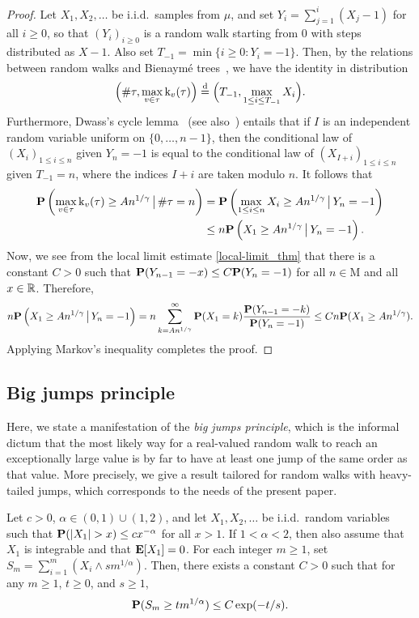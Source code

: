 \documentclass[11pt,reqno]{amsart}
\newcommand{\rk}{\mathrm{k}}
\begin{document}
\begin{proof}
Let $X_1,X_2,\ldots$ be i.i.d.~samples from $\mu$, and set $Y_i=\sum_{j=1}^i (X_j-1)$ for all $i\geq 0$, so that $(Y_i)_{i\ge 0}$ is a random walk starting from $0$ with steps distributed as $X-1$. Also set $T_{-1}=\min\{i\geq 0:Y_i=-1\}$. Then, by the relations between random walks and Bienaymé trees~\cite[Corollary 1.6]{legall2005random}, we have the identity in distribution
\[\Big(\#\tau,\max_{v\in\tau}\rk_v(\tau)\Big) \eqdist \Big(T_{-1},\max_{1\leq i\leq T_{-1}}X_i\Big).\]
Furthermore, Dwass's cycle lemma~\cite{dwass} (see also~\cite[Lemma~15.3]{JansonSurvey}) entails that if $I$ is an independent random variable uniform on $\{0,\ldots,n-1\}$, then the conditional law of $(X_i)_{1\leq i\leq n}$ given $Y_n={-1}$ is equal to the conditional law of $(X_{I+i})_{1\leq i\leq n}$ given $T_{-1}=n$, where the indices $I+i$ are taken modulo $n$. It follows that
\begin{align*}
\prob\left( \max_{v \in \tau} \rk_v(\tau) \geq An^{1/\gamma} \,\big|\, \#\tau =n \right)&=\prob\left(\max_{1\leq i\leq n} X_i\geq An^{1/\gamma} \,\big|\, Y_n=-1\right)\\
&\leq n\prob\left(X_1\geq An^{1/\gamma} \,\big|\, Y_n=-1\right).
\end{align*}
Now, we see from the local limit estimate \eqref{local-limit_thm} that there is a constant $C > 0$ such that $\prob(Y_{n-1}=-x)\leq C\prob(Y_n=-1)$ for all $n\in\mathrm{M}$ and all $x\in\R$. Therefore,
\[n\prob\left(X_1\geq An^{1/\gamma} \,\big|\, Y_n=-1\right)=n\sum_{k=An^{1/\gamma}}^{\infty} \prob(X_1 = k)\frac{\prob(Y_{n-1} = -k)}{\prob(Y_n=-1)}\leq Cn\prob(X_1\geq An^{1/\gamma}).\]
Applying Markov's inequality completes the proof.
\end{proof}


\subsection{Big jumps principle}

Here, we state a manifestation of the \emph{big jumps principle}, which is the informal dictum that the most likely way for a real-valued random walk to reach an exceptionally large value is by far to have at least one jump of the same order as that value. More precisely, we give a result tailored for random walks with heavy-tailed jumps, which corresponds to the needs of the present paper.

\begin{prop}\label{obj_0-1and1-2}
Let $c>0$, $\alpha\in (0,1)\cup (1,2)$, and let $X_1,X_2,\dots$ be i.i.d.~random variables such that $\P(|X_1|>x)\leq c x^{-\alpha}$ for all $x>1$. If $1<\alpha<2$, then also assume that $X_1$ is integrable and that $\E[X_1]=0$. For each integer $m\geq 1$, set $S_m=\sum_{i=1}^m (X_i\wedge s m^{1/\alpha})$. Then, there exists a constant $C>0$ such that for any $m\ge 1$, $t\geq 0$, and $s\geq 1$,
\[\P(S_m\ge t m^{1/\alpha})\le C \exp(-t/s) .\]
\end{prop}
\end{document}
